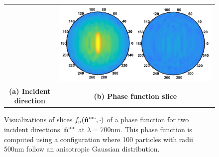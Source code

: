 \begin{figure}[t]
\begin{tabular}{ccc}
        & \multicolumn{2}{c}{\includegraphics[height=\resLen]{images/pfunc/aniso_y.png}}
        \\
        \textbf{(a) Incident direction} & \multicolumn{2}{c}{\textbf{(b) Phase function slice}}
    \end{tabular}
    \caption{\label{fig:aniso1}
        Visualizations of slices $f_\mathrm{p}(\mathbf{\hat{n}}^{\text{inc}},\cdot)$ of a phase function for two incident directions~$\mathbf{\hat{n}}^{\text{inc}}$ at $\lambda = 700\text{nm}$.
        This phase function is computed using a configuration where 100 particles with radii 500nm follow an anisotropic Gaussian distribution.
    }
\end{figure}
